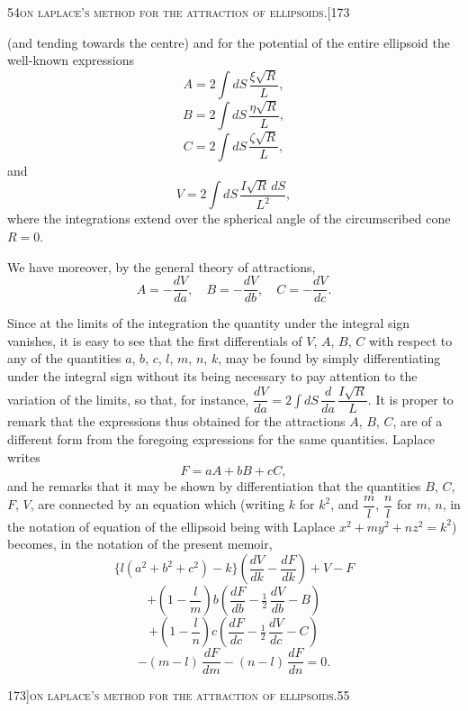 \documentclass[11pt]{article}
\begin{document}
\begin{center}
\small\textsc{54}\hfill\textsc{on laplace's method for the attraction of ellipsoids.}\hfill[173
\end{center}

\medskip

\noindent (and tending towards the centre) and for the potential of the entire ellipsoid the
well-known expressions
\[
A = 2 \int dS\, \frac{\xi\sqrt{R}}{L},
\]
\[
B = 2 \int dS\, \frac{\eta\sqrt{R}}{L},
\]
\[
C = 2 \int dS\, \frac{\zeta\sqrt{R}}{L},
\]
and
\[
V = 2 \int dS\, \frac{I\sqrt{R}\, dS}{L^{2}},
\]
where the integrations extend over the spherical angle of the circumscribed cone $R=0$.

We have moreover, by the general theory of attractions,
\[
A = -\frac{dV}{da},\quad B = -\frac{dV}{db},\quad C = -\frac{dV}{dc}.
\]

Since at the limits of the integration the quantity under the integral sign vanishes,
it is easy to see that the first differentials of $V$, $A$, $B$, $C$ with respect to any of the
quantities $a$, $b$, $c$, $l$, $m$, $n$, $k$, may be found by simply differentiating under the integral
sign without its being necessary to pay attention to the variation of the limits, so
that, for instance, $\dfrac{dV}{da} = 2 \int dS\, \dfrac{d}{da}\,\dfrac{I\sqrt{R}}{L}$. It is proper to remark that the expressions
thus obtained for the attractions $A$, $B$, $C$, are of a different form from the foregoing
expressions for the same quantities. Laplace writes
\[
F = aA + bB + cC,
\]
and he remarks that it may be shown by differentiation that the quantities $B$, $C$, $F$, $V$,
are connected by an equation which (writing $k$ for $k^{2}$, and $\dfrac{m}{l}$, $\dfrac{n}{l}$ for $m$, $n$, in the notation
of equation of the ellipsoid being with Laplace $x^{2} + my^{2} + nz^{2} = k^{2}$) becomes,
in the notation of the present memoir,
\[
\{l(a^{2} + b^{2} + c^{2}) - k\}\left( \frac{dV}{dk} - \frac{dF}{dk} \right) + V - F
\]
\[
+ \left(1 - \frac{l}{m}\right) b \left( \frac{dF}{db} - \tfrac{1}{2}\,\frac{dV}{db} - B\right)
\]
\[
+ \left(1 - \frac{l}{n}\right) c \left( \frac{dF}{dc} - \tfrac{1}{2}\,\frac{dV}{dc} - C\right)
\]
\[
- (m - l)\,\frac{dF}{dm} - (n - l)\,\frac{dF}{dn} = 0.
\]

\newpage

\begin{center}
\small 173]\hfill\textsc{on laplace's method for the attraction of ellipsoids.}\hfill\textsc{55}
\end{center}
\end{document}
